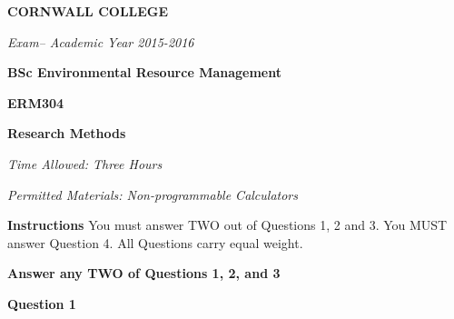 \documentclass[a4paper,12pt,fleqn]{article}
\newcommand{\institution}{CORNWALL COLLEGE}
\newcommand{\titlehd}{BSc Environmental Resource Management}
\newcommand{\examtype}{Exam}
\newcommand{\examdate}{Academic Year 2015-2016}
\newcommand{\examcode}{ERM304}
\newcommand{\examtitle}{Research Methods}
\newcommand{\readtime}{15 Minutes}
\newcommand{\writetime}{Three Hours}
\newcommand{\materials}{Non-programmable Calculators}
\begin{document}

\begin{center}
\large\textbf{\institution}
\end{center}
\vspace{1cm}

\begin{center}
\textit{ \examtype -- \examdate}
\end{center}
\vspace{1cm}

\begin{center}
\large\textbf{\titlehd}
\end{center}

\begin{center}
\large\textbf{\examcode}
\end{center}
\begin{center}
\large\textbf{\examtitle}
\end{center}
\vspace{4cm}
\vspace{4cm}

\begin{center}
\end{center}
\begin{center}
\textit{Time Allowed:  \writetime}
\end{center}
\begin{center}
\textit{Permitted Materials: \materials}
\end{center}

\newpage
\large{\textbf{Instructions}}\newline\newline
\large{You must answer TWO out of Questions 1, 2 and 3.}\newline\newline
\large{You MUST answer Question 4.}\newline\newline
\large{All Questions carry equal weight.}\newline\newline

\newpage


\bigskip

\textbf{\large{Answer any TWO of Questions 1, 2, and 3}}\newline


\textbf{Question 1}\newline
\end{document}
